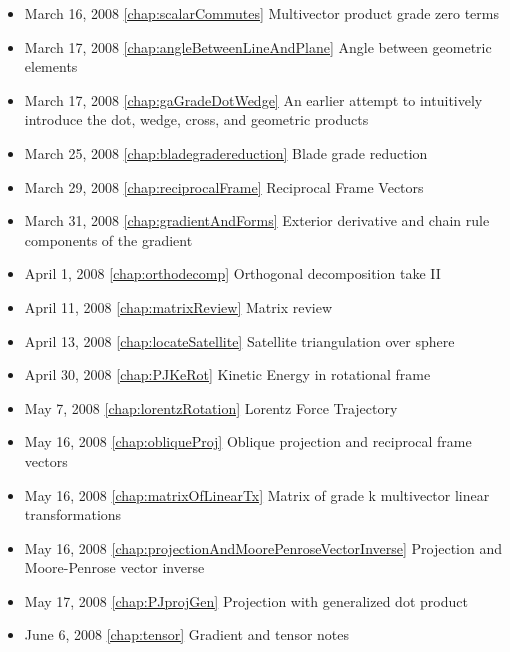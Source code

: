 \begin{itemize}
\item March 16, 2008 \ref{chap:scalarCommutes} Multivector product grade zero terms

\item March 17, 2008 \ref{chap:angleBetweenLineAndPlane} Angle between geometric elements

\item March 17, 2008 \ref{chap:gaGradeDotWedge} An earlier attempt to intuitively introduce the dot, wedge, cross, and geometric products

\item March 25, 2008 \ref{chap:bladegradereduction} Blade grade reduction

\item March 29, 2008 \ref{chap:reciprocalFrame} Reciprocal Frame Vectors

\item March 31, 2008 \ref{chap:gradientAndForms} Exterior derivative and chain rule components of the gradient

\item April 1, 2008 \ref{chap:orthodecomp} Orthogonal decomposition take II

\item April 11, 2008 \ref{chap:matrixReview} Matrix review

\item April 13, 2008 \ref{chap:locateSatellite} Satellite triangulation over sphere

\item April 30, 2008 \ref{chap:PJKeRot} Kinetic Energy in rotational frame

\item May 7, 2008 \ref{chap:lorentzRotation} Lorentz Force Trajectory

\item May 16, 2008 \ref{chap:obliqueProj} Oblique projection and reciprocal frame vectors

\item May 16, 2008 \ref{chap:matrixOfLinearTx} Matrix of grade k multivector linear transformations

\item May 16, 2008 \ref{chap:projectionAndMoorePenroseVectorInverse} Projection and Moore-Penrose vector inverse

\item May 17, 2008 \ref{chap:PJprojGen} Projection with generalized dot product

\item June 6, 2008 \ref{chap:tensor} Gradient and tensor notes


\end{itemize}

